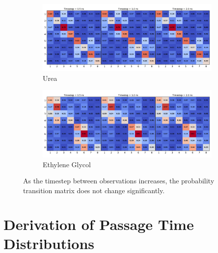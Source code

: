 \documentclass{article}
\begin{document}
  \begin{figure}
  \centering
  \begin{subfigure}{\textwidth}
  \includegraphics[width=\textwidth]{URE_transitions.pdf}
  \caption{Urea}\label{fig:URE_transitions}
  \end{subfigure}
  \begin{subfigure}{\textwidth}
  \includegraphics[width=\textwidth]{GCL_transitions.pdf}
  \caption{Ethylene Glycol}\label{fig:GCL_transitions}
  \end{subfigure}
  \caption{As the timestep between observations increases, the probability
  transition matrix does not change significantly.}\label{fig:transitions}
  \end{figure}
  
  \newpage  
  
  \section{Derivation of Passage Time Distributions}\label{section:fpt_derivation}
  
\end{document}
